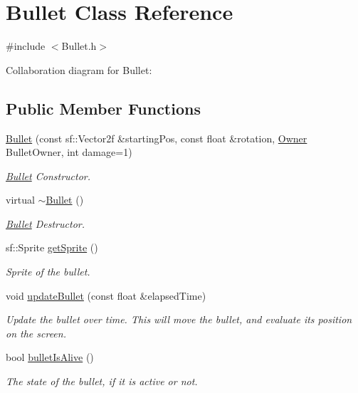 \hypertarget{class_bullet}{}\section{Bullet Class Reference}
\label{class_bullet}


{\ttfamily \#include $<$Bullet.\+h$>$}



Collaboration diagram for Bullet\+:
\subsection*{Public Member Functions}
\begin{DoxyCompactItemize}
\item 
\hyperlink{class_bullet_a751da85d043013c509426b6cf33bd9c5}{Bullet} (const sf\+::\+Vector2f \&starting\+Pos, const float \&rotation, \hyperlink{_bullet_8h_a3b5e9e55eb7b08d5702a101e529e5507}{Owner} Bullet\+Owner, int damage=1)
\begin{DoxyCompactList}\small\item\em \hyperlink{class_bullet}{Bullet} Constructor. \end{DoxyCompactList}\item 
virtual \hyperlink{class_bullet_aaeb5cb41d7db89f49007b08b41f1bfcf}{$\sim$\+Bullet} ()
\begin{DoxyCompactList}\small\item\em \hyperlink{class_bullet}{Bullet} Destructor. \end{DoxyCompactList}\item 
sf\+::\+Sprite \hyperlink{class_bullet_aa313bc0e2c9fd200c526cb6fe320462c}{get\+Sprite} ()
\begin{DoxyCompactList}\small\item\em Sprite of the bullet. \end{DoxyCompactList}\item 
void \hyperlink{class_bullet_a241c1ceb808ae0f93e4f66f28bbd525f}{update\+Bullet} (const float \&elapsed\+Time)
\begin{DoxyCompactList}\small\item\em Update the bullet over time. This will move the bullet, and evaluate its position on the screen. \end{DoxyCompactList}\item 
bool \hyperlink{class_bullet_a103ff9146dce215f15ca0c4282a5a8cf}{bullet\+Is\+Alive} ()
\begin{DoxyCompactList}\small\item\em The state of the bullet, if it is active or not. \end{DoxyCompactList}\item 

\end{DoxyCompactItemize}
